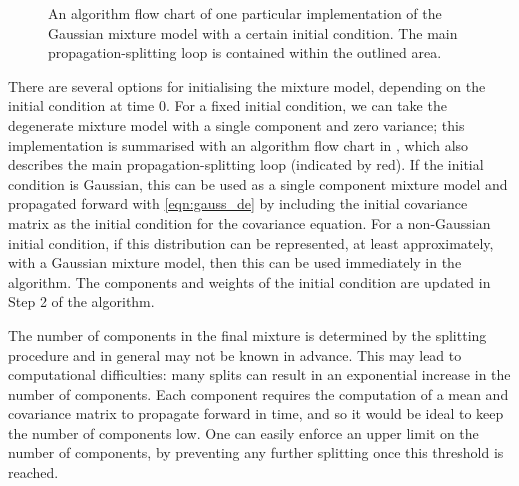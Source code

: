 \begin{figure}
	\caption{An algorithm flow chart of one particular implementation of the Gaussian mixture model with a certain initial condition.
		The main propagation-splitting loop is contained within the outlined area.}
	\label{fig:gmm_alg_diag}
\end{figure}

There are several options for initialising the mixture model, depending on the initial condition at time \(0\).
For a fixed initial condition, we can take the degenerate mixture model with a single component and zero variance; this implementation is summarised with an algorithm flow chart in , which also describes the main propagation-splitting loop (indicated by red).
If the initial condition is Gaussian, this can be used as a single component mixture model and propagated forward with \cref{eqn:gauss_de} by including the initial covariance matrix as the initial condition for the covariance equation.
For a non-Gaussian initial condition, if this distribution can be represented, at least approximately, with a Gaussian mixture model, then this can be used immediately in the algorithm.
The components and weights of the initial condition are updated in Step 2 of the algorithm.

The number of components in the final mixture is determined by the splitting procedure and in general may not be known in advance.
This may lead to computational difficulties: many splits can result in an exponential increase in the number of components.
Each component requires the computation of a mean and covariance matrix to propagate forward in time, and so it would be ideal to keep the number of components low.
One can easily enforce an upper limit on the number of components, by preventing any further splitting once this threshold is reached.

